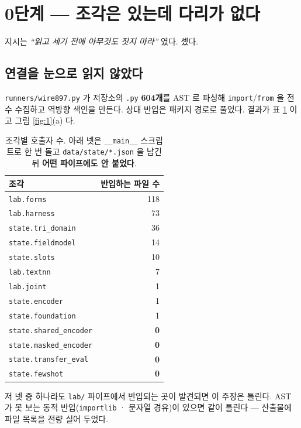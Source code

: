 \documentclass[10pt]{article}
\begin{document}
\section{0단계 --- 조각은 있는데 다리가 없다}

지시는 \emph{``읽고 세기 전에 아무것도 짓지 마라''} 였다. 셌다.

\subsection{연결을 눈으로 읽지 않았다}

\texttt{runners/wire897.py} 가 저장소의 \texttt{.py} \textbf{604개}를 AST 로 파싱해
\texttt{import}/\texttt{from} 을 전수 수집하고 역방향 색인을 만든다. 상대 반입은
패키지 경로로 풀었다. 결과가 표 \ref{tab:graph} 이고 그림 \ref{fig:1}(a) 다.

\begin{table}[h]\centering\tsize
\begin{tabular}{lr}
\toprule
조각 & 반입하는 파일 수 \\
\midrule
\texttt{lab.forms} & 118 \\
\texttt{lab.harness} & 73 \\
\texttt{state.tri\_domain} & 36 \\
\texttt{state.fieldmodel} & 14 \\
\texttt{state.slots} & 10 \\
\texttt{lab.textnn} & 7 \\
\texttt{lab.joint} & 1 \\
\texttt{state.encoder} & 1 \\
\texttt{state.foundation} & 1 \\
\midrule
\texttt{state.shared\_encoder} & \textbf{0} \\
\texttt{state.masked\_encoder} & \textbf{0} \\
\texttt{state.transfer\_eval} & \textbf{0} \\
\texttt{state.fewshot} & \textbf{0} \\
\bottomrule
\end{tabular}
\caption{조각별 호출자 수. 아래 넷은 \texttt{\_\_main\_\_} 스크립트로 한 번 돌고
\texttt{data/state/*.json} 을 남긴 뒤 \textbf{어떤 파이프에도 안 붙었다}.}
\label{tab:graph}
\end{table}

{저 넷 중 하나라도 \texttt{lab/} 파이프에서 반입되는 곳이 발견되면 이 주장은
틀린다. AST 가 못 보는 동적 반입(\texttt{importlib} · 문자열 경유)이 있으면
같이 틀린다 --- 산출물에 파일 목록을 전량 실어 두었다.}
\end{document}
